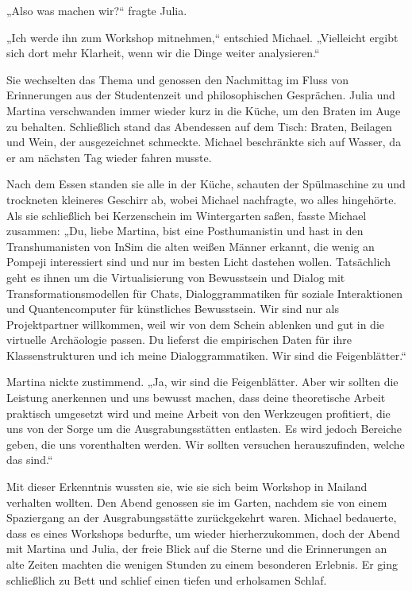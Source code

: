 \documentclass[
]{article}
\begin{document}
„Also was machen wir?{\kern0pt}`` fragte Julia.

„Ich werde ihn zum Workshop mitnehmen,`` entschied Michael. „Vielleicht
ergibt sich dort mehr Klarheit, wenn wir die Dinge weiter analysieren.``

Sie wechselten das Thema und genossen den Nachmittag im Fluss von
Erinnerungen aus der Studentenzeit und philosophischen Gesprächen. Julia
und Martina verschwanden immer wieder kurz in die Küche, um den Braten
im Auge zu behalten. Schließlich stand das Abendessen auf dem Tisch:
Braten, Beilagen und Wein, der ausgezeichnet schmeckte. Michael
beschränkte sich auf Wasser, da er am nächsten Tag wieder fahren musste.

Nach dem Essen standen sie alle in der Küche, schauten der Spülmaschine
zu und trockneten kleineres Geschirr ab, wobei Michael nachfragte, wo
alles hingehörte. Als sie schließlich bei Kerzenschein im Wintergarten
saßen, fasste Michael zusammen: „Du, liebe Martina, bist eine
Posthumanistin und hast in den Transhumanisten von InSim die alten
weißen Männer erkannt, die wenig an Pompeji interessiert sind und nur im
besten Licht dastehen wollen. Tatsächlich geht es ihnen um die
Virtualisierung von Bewusstsein und Dialog mit Transformationsmodellen
für Chats, Dialoggrammatiken für soziale Interaktionen und
Quantencomputer für künstliches Bewusstsein. Wir sind nur als
Projektpartner willkommen, weil wir von dem Schein ablenken und gut in
die virtuelle Archäologie passen. Du lieferst die empirischen Daten für
ihre Klassenstrukturen und ich meine Dialoggrammatiken. Wir sind die
Feigenblätter.``

Martina nickte zustimmend. „Ja, wir sind die Feigenblätter. Aber wir
sollten die Leistung anerkennen und uns bewusst machen, dass deine
theoretische Arbeit praktisch umgesetzt wird und meine Arbeit von den
Werkzeugen profitiert, die uns von der Sorge um die Ausgrabungsstätten
entlasten. Es wird jedoch Bereiche geben, die uns vorenthalten werden.
Wir sollten versuchen herauszufinden, welche das sind.``

Mit dieser Erkenntnis wussten sie, wie sie sich beim Workshop in Mailand
verhalten wollten. Den Abend genossen sie im Garten, nachdem sie von
einem Spaziergang an der Ausgrabungsstätte zurückgekehrt waren. Michael
bedauerte, dass es eines Workshops bedurfte, um wieder hierherzukommen,
doch der Abend mit Martina und Julia, der freie Blick auf die Sterne und
die Erinnerungen an alte Zeiten machten die wenigen Stunden zu einem
besonderen Erlebnis. Er ging schließlich zu Bett und schlief einen
tiefen und erholsamen Schlaf.
\end{document}
